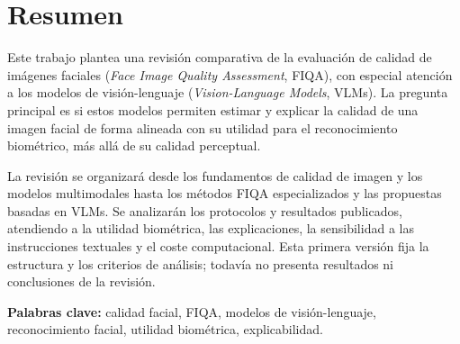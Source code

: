 \section*{Resumen}
Este trabajo plantea una revisión comparativa de la evaluación de calidad de imágenes faciales (\textit{Face Image Quality Assessment}, FIQA), con especial atención a los modelos de visión-lenguaje (\textit{Vision-Language Models}, VLMs). La pregunta principal es si estos modelos permiten estimar y explicar la calidad de una imagen facial de forma alineada con su utilidad para el reconocimiento biométrico, más allá de su calidad perceptual.

La revisión se organizará desde los fundamentos de calidad de imagen y los modelos multimodales hasta los métodos FIQA especializados y las propuestas basadas en VLMs. Se analizarán los protocolos y resultados publicados, atendiendo a la utilidad biométrica, las explicaciones, la sensibilidad a las instrucciones textuales y el coste computacional. Esta primera versión fija la estructura y los criterios de análisis; todavía no presenta resultados ni conclusiones de la revisión.

\textbf{Palabras clave:} calidad facial, FIQA, modelos de visión-lenguaje, reconocimiento facial, utilidad biométrica, explicabilidad.
